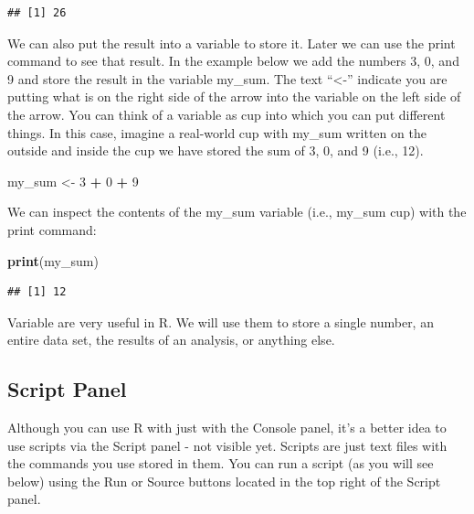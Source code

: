 \documentclass[
]{krantz}
\makeatletter
\newenvironment{Shaded}{\begin{snugshade}}{\end{snugshade}}
\newcommand{\DecValTok}[1]{\textcolor[rgb]{0.06,0.06,0.06}{#1}}
\newcommand{\KeywordTok}[1]{\textcolor[rgb]{0.27,0.27,0.27}{\textbf{#1}}}
\newcommand{\NormalTok}[1]{#1}
\newcommand{\OperatorTok}[1]{\textcolor[rgb]{0.43,0.43,0.43}{\textbf{#1}}}
\newcommand{\StringTok}[1]{\textcolor[rgb]{0.5,0.5,0.5}{#1}}
\newenvironment{kframe}{%
\medskip{}
\setlength{\fboxsep}{.8em}
 \def\at@end@of@kframe{}%
 \ifinner\ifhmode%
  \def\at@end@of@kframe{\end{minipage}}%
  \begin{minipage}{\columnwidth}%
 \fi\fi%
 \def\FrameCommand##1{\hskip\@totalleftmargin \hskip-\fboxsep
 \colorbox{shadecolor}{##1}\hskip-\fboxsep
     \hskip-\linewidth \hskip-\@totalleftmargin \hskip\columnwidth}%
 \MakeFramed {\advance\hsize-\width
   \@totalleftmargin\z@ \linewidth\hsize
   \@setminipage}}%
 {\par\unskip\endMakeFramed%
 \at@end@of@kframe}
\renewenvironment{Shaded}{\begin{kframe}}{\end{kframe}}
\makeatother
\begin{document}
\begin{verbatim}
## [1] 26
\end{verbatim}

We can also put the result into a variable to store it. Later we can use the print command to see that result. In the example below we add the numbers 3, 0, and 9 and store the result in the variable my\_sum. The text ``\textless-'' indicate you are putting what is on the right side of the arrow into the variable on the left side of the arrow. You can think of a variable as cup into which you can put different things. In this case, imagine a real-world cup with my\_sum written on the outside and inside the cup we have stored the sum of 3, 0, and 9 (i.e., 12).

\begin{Shaded}
\begin{Highlighting}[]
\NormalTok{my_sum <-}\StringTok{ }\DecValTok{3} \OperatorTok{+}\StringTok{ }\DecValTok{0} \OperatorTok{+}\StringTok{ }\DecValTok{9}
\end{Highlighting}
\end{Shaded}

We can inspect the contents of the my\_sum variable (i.e., my\_sum cup) with the print command:

\begin{Shaded}
\begin{Highlighting}[]
\KeywordTok{print}\NormalTok{(my_sum)}
\end{Highlighting}
\end{Shaded}

\begin{verbatim}
## [1] 12
\end{verbatim}

Variable are very useful in R. We will use them to store a single number, an entire data set,
the results of an analysis, or anything else.

\hypertarget{script-panel}{%
\subsection{Script Panel}\label{script-panel}}

Although you can use R with just with the Console panel, it's a better idea to use scripts via the Script panel - not visible yet. Scripts are just text files with the commands you use stored in them. You can run a script (as you will see below) using the Run or Source buttons located in the top right of the Script panel.
\end{document}
